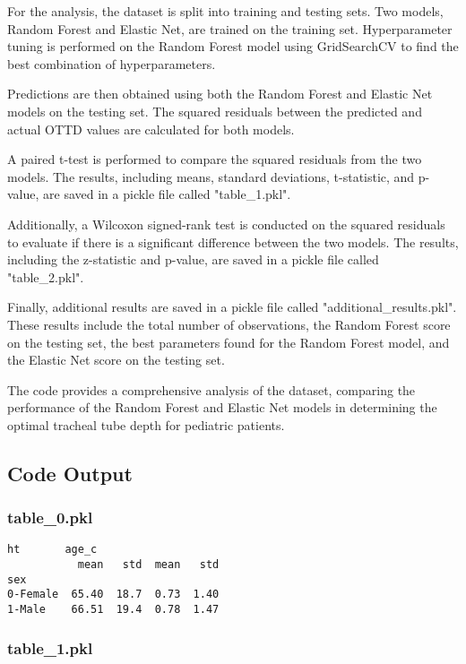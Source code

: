\documentclass[11pt]{article}
\begin{document}
For the analysis, the dataset is split into training and testing sets. Two models, Random Forest and Elastic Net, are trained on the training set. Hyperparameter tuning is performed on the Random Forest model using GridSearchCV to find the best combination of hyperparameters.

Predictions are then obtained using both the Random Forest and Elastic Net models on the testing set. The squared residuals between the predicted and actual OTTD values are calculated for both models.

A paired t-test is performed to compare the squared residuals from the two models. The results, including means, standard deviations, t-statistic, and p-value, are saved in a pickle file called "table\_1.pkl".

Additionally, a Wilcoxon signed-rank test is conducted on the squared residuals to evaluate if there is a significant difference between the two models. The results, including the z-statistic and p-value, are saved in a pickle file called "table\_2.pkl".

Finally, additional results are saved in a pickle file called "additional\_results.pkl". These results include the total number of observations, the Random Forest score on the testing set, the best parameters found for the Random Forest model, and the Elastic Net score on the testing set.

The code provides a comprehensive analysis of the dataset, comparing the performance of the Random Forest and Elastic Net models in determining the optimal tracheal tube depth for pediatric patients.

\subsection{Code Output}

\subsubsection*{table\_0.pkl}

\begin{Verbatim}[tabsize=4]
             ht       age_c
           mean   std  mean   std
sex
0-Female  65.40  18.7  0.73  1.40
1-Male    66.51  19.4  0.78  1.47
\end{Verbatim}

\subsubsection*{table\_1.pkl}
\end{document}
